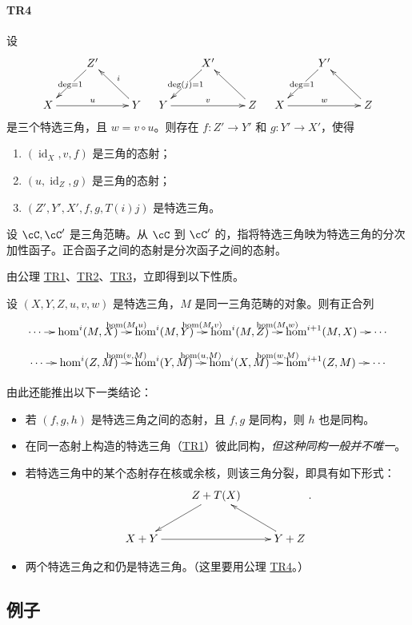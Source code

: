 \paragraph{TR4}\hypertarget{VIII:TR4}{}
设
\[\xymatrix{&Z'\ar[dl]|{\deg=1}\\X\ar[rr]^-u&&Y\ar[ul]_-i}
\quad\xymatrix{&X'\ar[dl]|{\deg(j)=1}\\Y\ar[rr]^-v&&Z\ar[ul]}
\quad\xymatrix{&Y'\ar[dl]|{\deg=1}\\X\ar[rr]^-w&&Z\ar[ul]}
\]
是三个特选三角，且 $w=v\circ u$。则存在 $f:Z'\to Y'$ 和 $g:Y'\to X'$，使得
\begin{enumerate}
\item $(\operatorname{id}_X,v,f)$ 是三角的态射；
\item $(u,\operatorname{id}_Z,g)$ 是三角的态射；
\item $(Z',Y',X',f,g,T(i)j)$ 是特选三角。
\end{enumerate}
设 $\cC,\cC'$ 是三角范畴。从 $\cC$ 到 $\cC'$ 的，指将特选三角映为特选三角的分次加性函子。正合函子之间的态射是分次函子之间的态射。

由公理 \hyperlink{VIII:TR1}{TR1}、\hyperlink{VIII:TR2}{TR2}、\hyperlink{VIII:TR3}{TR3}，立即得到以下性质。
\begin{proposition}\label{VIII:1-1-2}
设 $(X,Y,Z,u,v,w)$ 是特选三角，$M$ 是同一三角范畴的对象。则有正合列
\[\xymatrix@C=9pt{
\cdots\ar[r]&\hom^i(M,X)\ar[r]^-{\hom(M,u)}&\hom^i(M,Y)\ar[r]^-{\hom(M,v)}&\hom^i(M,Z)\ar[r]^-{\hom(M,w)}&\hom^{i+1}(M,X)\ar[r]&\cdots}
\]
\[\xymatrix@C=9pt{
\cdots\ar[r]&\hom^i(Z,M)\ar[r]^-{\hom(v,M)}&\hom^i(Y,M)\ar[r]^-{\hom(u,M)}&\hom^i(X,M)\ar[r]^-{\hom(w,M)}&\hom^{i+1}(Z,M)\ar[r]&\cdots}
\]
\end{proposition}
由此还能推出以下一类结论：
\begin{itemize}
\item 若 $(f,g,h)$ 是特选三角之间的态射，且 $f,g$ 是同构，则 $h$ 也是同构。
\item 在同一态射上构造的特选三角（\hyperlink{VIII:TR1}{TR1}）彼此同构，\emph{但这种同构一般并不唯一}。
\item 若特选三角中的某个态射存在核或余核，则该三角分裂，即具有如下形式：
\[\xymatrix{&Z+T(X)\ar[dl]\\X+Y\ar[rr]&&Y+Z\ar[ul]}.\]
\item 两个特选三角之和仍是特选三角。（这里要用公理 \hyperlink{VIII:TR4}{TR4}。）
\end{itemize}
\subsection{例子}\label{VIII:1-2}
